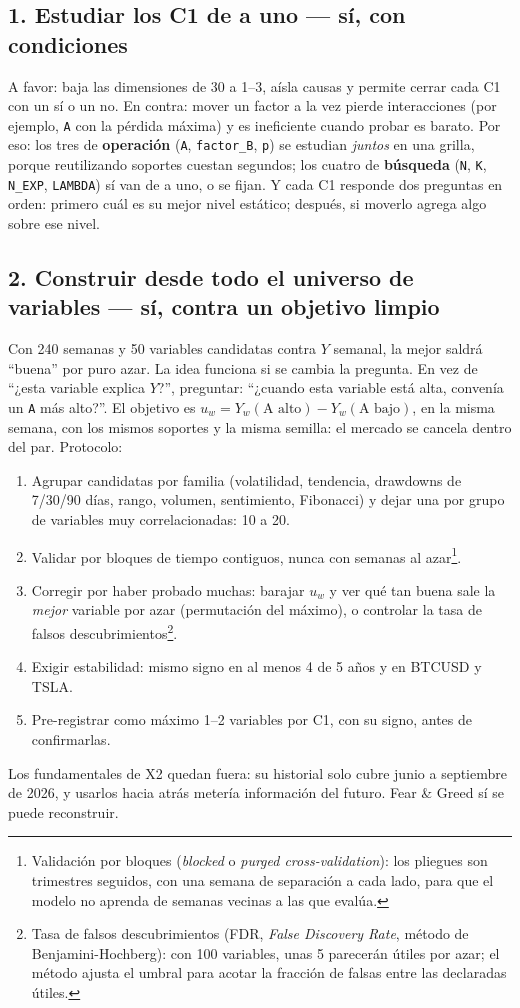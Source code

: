\documentclass[11pt,a4paper]{article}
\newcommand{\code}[1]{\texttt{\small #1}}
\begin{document}
\subsection*{1. Estudiar los C1 de a uno — sí, con condiciones}
A favor: baja las dimensiones de 30 a 1--3, aísla causas y permite cerrar cada C1 con un sí o un no. En
contra: mover un factor a la vez pierde interacciones (por ejemplo, \code{A} con la pérdida máxima) y es
ineficiente cuando probar es barato. Por eso: los tres de \textbf{operación} (\code{A}, \code{factor\_B},
\code{p}) se estudian \emph{juntos} en una grilla, porque reutilizando soportes cuestan segundos; los cuatro
de \textbf{búsqueda} (\code{N}, \code{K}, \code{N\_EXP}, \code{LAMBDA}) sí van de a uno, o se fijan. Y cada
C1 responde dos preguntas en orden: primero cuál es su mejor nivel estático; después, si moverlo agrega algo
sobre ese nivel.

\subsection*{2. Construir desde todo el universo de variables — sí, contra un objetivo limpio}
Con 240 semanas y 50 variables candidatas contra $Y$ semanal, la mejor saldrá ``buena'' por puro azar. La
idea funciona si se cambia la pregunta. En vez de ``¿esta variable explica $Y$?'', preguntar: ``¿cuando
esta variable está alta, convenía un \code{A} más alto?''. El objetivo es
$u_w = Y_w(\text{A alto}) - Y_w(\text{A bajo})$, en la misma semana, con los mismos soportes y la misma
semilla: el mercado se cancela dentro del par. Protocolo:
\begin{enumerate}[leftmargin=1.4em]
  \item Agrupar candidatas por familia (volatilidad, tendencia, drawdowns de 7/30/90 días, rango, volumen,
        sentimiento, Fibonacci) y dejar una por grupo de variables muy correlacionadas: 10 a 20.
  \item Validar por bloques de tiempo contiguos, nunca con semanas al azar\footnote{Validación por bloques
        (\emph{blocked} o \emph{purged cross-validation}): los pliegues son trimestres seguidos, con una semana
        de separación a cada lado, para que el modelo no aprenda de semanas vecinas a las que evalúa.}.
  \item Corregir por haber probado muchas: barajar $u_w$ y ver qué tan buena sale la \emph{mejor} variable
        por azar (permutación del máximo), o controlar la tasa de falsos descubrimientos\footnote{Tasa de
        falsos descubrimientos (FDR, \emph{False Discovery Rate}, método de Benjamini-Hochberg): con 100
        variables, unas 5 parecerán útiles por azar; el método ajusta el umbral para acotar la fracción de
        falsas entre las declaradas útiles.}.
  \item Exigir estabilidad: mismo signo en al menos 4 de 5 años y en BTCUSD y TSLA.
  \item Pre-registrar como máximo 1--2 variables por C1, con su signo, antes de confirmarlas.
\end{enumerate}
Los fundamentales de X2 quedan fuera: su historial solo cubre junio a septiembre de 2026, y usarlos hacia
atrás metería información del futuro. Fear \& Greed sí se puede reconstruir.
\end{document}
